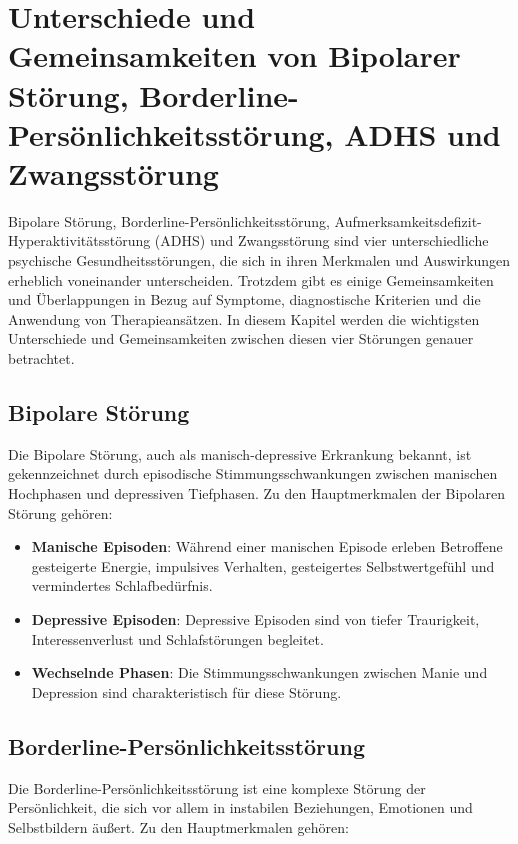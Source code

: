 \section{Unterschiede und Gemeinsamkeiten von Bipolarer Störung, Borderline-Persönlichkeitsstörung, ADHS und Zwangsstörung}

Bipolare Störung, Borderline-Persönlichkeitsstörung, Aufmerksamkeitsdefizit-Hyperaktivitätsstörung (ADHS) und Zwangsstörung sind vier unterschiedliche psychische Gesundheitsstörungen, die sich in ihren Merkmalen und Auswirkungen erheblich voneinander unterscheiden. Trotzdem gibt es einige Gemeinsamkeiten und Überlappungen in Bezug auf Symptome, diagnostische Kriterien und die Anwendung von Therapieansätzen. In diesem Kapitel werden die wichtigsten Unterschiede und Gemeinsamkeiten zwischen diesen vier Störungen genauer betrachtet.

\subsection{Bipolare Störung}

Die Bipolare Störung, auch als manisch-depressive Erkrankung bekannt, ist gekennzeichnet durch episodische Stimmungsschwankungen zwischen manischen Hochphasen und depressiven Tiefphasen. Zu den Hauptmerkmalen der Bipolaren Störung gehören:

\begin{itemize}
\item \textbf{Manische Episoden}: Während einer manischen Episode erleben Betroffene gesteigerte Energie, impulsives Verhalten, gesteigertes Selbstwertgefühl und vermindertes Schlafbedürfnis.

\item \textbf{Depressive Episoden}: Depressive Episoden sind von tiefer Traurigkeit, Interessenverlust und Schlafstörungen begleitet.

\item \textbf{Wechselnde Phasen}: Die Stimmungsschwankungen zwischen Manie und Depression sind charakteristisch für diese Störung.
\end{itemize}

\subsection{Borderline-Persönlichkeitsstörung}

Die Borderline-Persönlichkeitsstörung ist eine komplexe Störung der Persönlichkeit, die sich vor allem in instabilen Beziehungen, Emotionen und Selbstbildern äußert. Zu den Hauptmerkmalen gehören:


